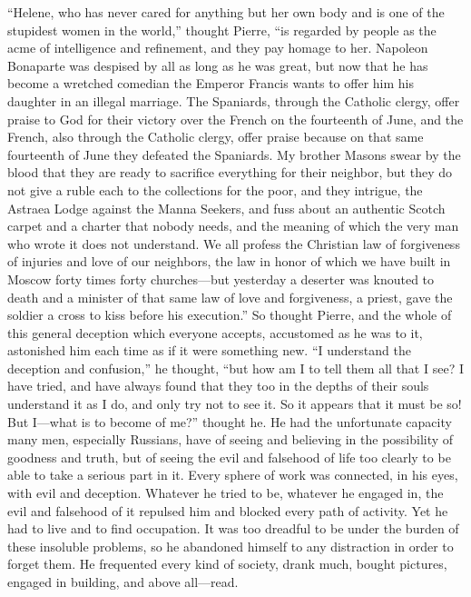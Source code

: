 ``Helene, who has never cared for anything but her own body and
is one of the stupidest women in the world,'' thought Pierre,
``is regarded by people as the acme of intelligence and
refinement, and they pay homage to her. Napoleon Bonaparte was
despised by all as long as he was great, but now that he has
become a wretched comedian the Emperor Francis wants to offer him
his daughter in an illegal marriage. The Spaniards, through the
Catholic clergy, offer praise to God for their victory over the
French on the fourteenth of June, and the French, also through
the Catholic clergy, offer praise because on that same fourteenth
of June they defeated the Spaniards. My brother Masons swear by
the blood that they are ready to sacrifice everything for their
neighbor, but they do not give a ruble each to the collections
for the poor, and they intrigue, the Astraea Lodge against the
Manna Seekers, and fuss about an authentic Scotch carpet and a
charter that nobody needs, and the meaning of which the very man
who wrote it does not understand. We all profess the Christian
law of forgiveness of injuries and love of our neighbors, the law
in honor of which we have built in Moscow forty times forty
churches---but yesterday a deserter was knouted to death and a
minister of that same law of love and forgiveness, a priest, gave
the soldier a cross to kiss before his execution.'' So thought
Pierre, and the whole of this general deception which everyone
accepts, accustomed as he was to it, astonished him each time as
if it were something new. ``I understand the deception and
confusion,'' he thought, ``but how am I to tell them all that I
see? I have tried, and have always found that they too in the
depths of their souls understand it as I do, and only try not to
see it.  So it appears that it must be so! But I---what is to
become of me?''  thought he. He had the unfortunate capacity many
men, especially Russians, have of seeing and believing in the
possibility of goodness and truth, but of seeing the evil and
falsehood of life too clearly to be able to take a serious part
in it. Every sphere of work was connected, in his eyes, with evil
and deception. Whatever he tried to be, whatever he engaged in,
the evil and falsehood of it repulsed him and blocked every path
of activity. Yet he had to live and to find occupation. It was
too dreadful to be under the burden of these insoluble problems,
so he abandoned himself to any distraction in order to forget
them. He frequented every kind of society, drank much, bought
pictures, engaged in building, and above all---read.

